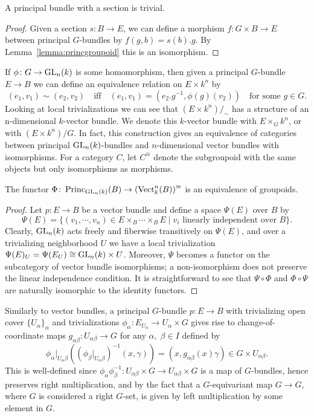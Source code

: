 \documentclass[a4paper,openany]{scrbook}
\DeclareMathOperator{\Vect}{Vect}
\DeclareMathOperator{\Princ}{Princ}
\begin{document}
\begin{corollary}
A principal bundle with a section is trivial.
\end{corollary}
\begin{proof}
  Given a section $s\colon B \to E$, we can define a morphism $f\colon G \times B \rightarrow E$ between principal $G$-bundles by $f(g,b) = s(b).g$. By Lemma~\ref{lemma:princgroupoid} this is an isomorphism.
\end{proof}

If $\phi\colon G \to \operatorname{GL}_n(k)$ is some homomorphism, then given a principal $G$-bundle $E \to B$ we can define an equivalence relation on $E \times k^n$ by
\[
  (e_1,v_1) \sim (e_2,v_2) \quad \text{iff} \quad (e_1, v_1) = (e_2.g^{-1},\phi(g)(v_2)) \quad \text{for some }g \in G.
\] 
Looking at local trivializations we can see that $(E\times k^n)/_{\sim}$ has a structure of an n-dimensional $k$-vector bundle. We denote this $k$-vector bundle with $E \times_G k^n$, or with $(E \times k^n)/G$. In fact, this construction gives an equivalence of categories between principal $\operatorname{GL}_n(k)$-bundles and $n$-dimensional vector bundles with isomorphisms. For a category $C$, let $C^{\cong}$ denote the subgroupoid with the same objects but only isomorphisms as morphisms. 

\begin{prop}
The functor $\Phi\colon \Princ_{\GL_n(k)}(B) \to (\Vect^n_k(B))^{\cong}$ is an equivalence of groupoids.
\end{prop}
\begin{proof}
Let $p\colon E \to B$ be a vector bundle and define a space $\Psi(E)$ over $B$ by
\[
\Psi(E) = \{(v_1,\cdots,v_n) \in E \times_B \cdots \times_B E \mid v_i \text{ linearly independent over $B$}\}.
\]
Clearly, $\operatorname{GL}_n(k)$ acts freely and fiberwise transitively on $\Psi(E)$, and over a trivializing neighborhood $U$ we have a local trivialization $\Psi(E)_U = \Psi(E_U) \cong \operatorname{GL}_n(k) \times U$. Moreover, $\Psi$ becomes a functor on the subcategory of vector bundle isomorphisms; a non-isomorphism does not preserve the linear independence condition. It is straightforward to see that $\Psi\circ\Phi$ and $\Phi\circ\Psi$ are naturally isomorphic to the identity functors.
\end{proof}

Similarly to vector bundles, a principal $G$-bundle $p\colon E \to B$ with trivializing open cover $\{U_\alpha\}_{\alpha}$ and trivializations $\phi_\alpha\colon E_{U_{\alpha}} \to U_{\alpha} \times G $ gives rise to change-of-coordinate maps $g_{\alpha\beta}\colon U_{\alpha\beta} \to G$ for any $\alpha,\;\beta \in I$ defined by
\[
\phi_\alpha|_{U_\alpha\beta}\left((\phi_\beta|_{U_\alpha\beta})^{-1}(x,\gamma)\right) = (x,g_{\alpha\beta}(x)\gamma) \in G \times U_{\alpha\beta}.
\]
This is well-defined since $\phi_\alpha\phi_\beta^{-1}\colon U_{\alpha \beta} \times G \to U_{\alpha \beta} \times G$ is a map of $G$-bundles, hence preserves right multiplication, and by the fact that a $G$-equivariant map $G \to G$, where $G$ is considered a right $G$-set, is given by left multiplication by some element in $G$.
\end{document}

